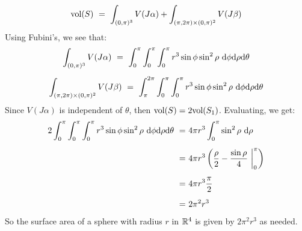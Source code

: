 \begin{soln}
    \begin{equation*}
        \textrm{vol}(S) \ = \ \int_{(0, \pi)^{3}}V(J\alpha)
        + \int_{(\pi, 2\pi) \times (0,\pi)^{2}}V(J\beta)
    \end{equation*}
    Using Fubini's, we see that:
    \begin{gather*}
        \int_{(0, \pi)^{3}}V(J\alpha)
        \ = \ \int_{0}^{\pi} \int_{0}^{\pi} \int_{0}^{\pi}
        r^{3}\sin\phi\sin^{2}\rho \ 
        \d\phi\d\rho\d\theta \vsp
        \int_{(\pi, 2\pi) \times (0, \pi)^{2}}V(J\beta)
        \ = \ \int_{\pi}^{2\pi} \int_{0}^{\pi} \int_{0}^{\pi}
        r^{3}\sin\phi\sin^{2}\rho \ 
        \d\phi\d\rho\d\theta
    \end{gather*}
    Since $ V(J\alpha) $ is independent of $ \theta $, then $ \textrm{vol}(S)
    = 2\textrm{vol}(S_{1}) $. Evaluating, we get:
    \begin{align*}
        2\int_{0}^{\pi}\int_{0}^{\pi}\int_{0}^{\pi}
        r^{3}\sin\phi\sin^{2}\rho \ \d\phi\d\rho\d\theta \
        = \ & 4\pi r^{3} \int_{0}^{\pi}\sin^{2}\rho \ \d\rho \vsp
        = \ & 4\pi r^{3} \left(\frac{\rho}{2} - \frac{\sin\rho}{4} \
        \bigg\rvert_{0}^{\pi} \right) \vsp
        = \ & 4\pi r^{3} \frac{\pi}{2} \vsp
        = \ & 2\pi^{2}r^{3}
    \end{align*}
    So the surface area of a sphere with radius $ r $ in $ \mathbb{R}^{4} $ is
    given by $ 2\pi^{2} r^{3} $ as needed.
\end{soln}
